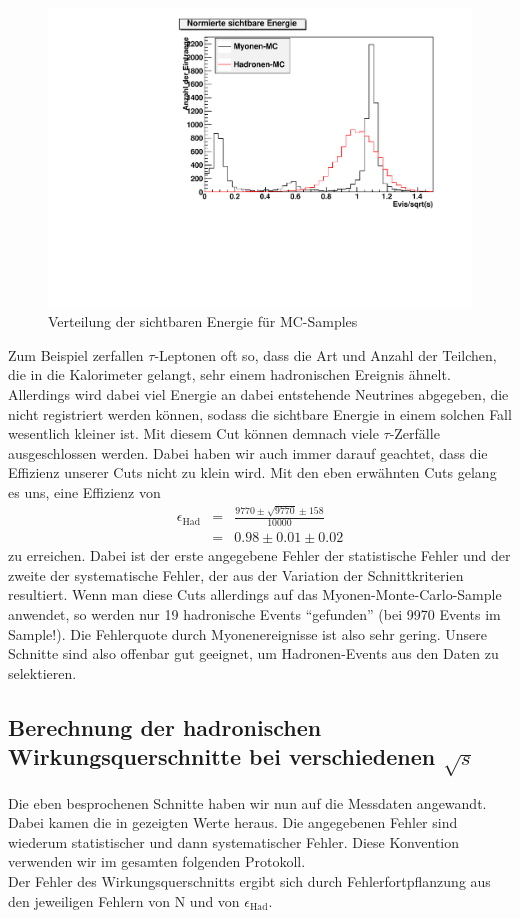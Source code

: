 \begin{figure}[htb]
	\centering
	\includegraphics[width=1\columnwidth,keepaspectratio]{Evisvgl_mc.pdf}
	\caption{Verteilung der sichtbaren Energie für MC-Samples}
	\label{fig:Evisvgl_mc}
\end{figure}
Zum Beispiel zerfallen $\tau$-Leptonen oft so, dass die Art und Anzahl der Teilchen, die in die Kalorimeter gelangt, sehr einem hadronischen Ereignis ähnelt. Allerdings wird dabei viel Energie an dabei entstehende Neutrines abgegeben, die nicht registriert werden können, sodass die sichtbare Energie in einem solchen Fall wesentlich kleiner ist. Mit diesem Cut können demnach viele $\tau$-Zerfälle ausgeschlossen werden. Dabei haben wir auch immer darauf geachtet, dass die Effizienz unserer Cuts nicht zu klein wird. Mit den eben erwähnten Cuts gelang es uns, eine Effizienz von
\begin{eqnarray}
\epsilon_\mathrm{Had} &=& \frac{9770 \pm \sqrt{9770} \pm 158}{10000}\\
\nonumber &=& 0.98 \pm 0.01 \pm 0.02
\end{eqnarray}
zu erreichen. Dabei ist der erste angegebene Fehler der statistische Fehler und der zweite der systematische Fehler, der aus der Variation der Schnittkriterien resultiert. Wenn man diese Cuts allerdings auf das Myonen-Monte-Carlo-Sample anwendet, so werden nur 19 hadronische Events ``gefunden'' (bei 9970 Events im Sample!). Die Fehlerquote durch Myonenereignisse ist also sehr gering. Unsere Schnitte sind also offenbar gut geeignet, um Hadronen-Events aus den Daten zu selektieren.

\subsection{Berechnung der hadronischen Wirkungsquerschnitte bei verschiedenen $\sqrt{s}$}
Die eben besprochenen Schnitte haben wir nun auf die Messdaten angewandt. Dabei kamen die in  gezeigten Werte heraus. Die angegebenen Fehler sind wiederum statistischer und dann systematischer Fehler. Diese Konvention verwenden wir im gesamten folgenden Protokoll.\\
Der Fehler des Wirkungsquerschnitts ergibt sich durch Fehlerfortpflanzung aus den jeweiligen Fehlern von N und von $\epsilon_\mathrm{Had}$.


